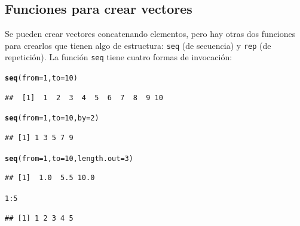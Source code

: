 \documentclass{config/apuntes}\usepackage[]{graphicx}\usepackage[]{xcolor}
\makeatletter
\newcommand{\hlnum}[1]{\textcolor[rgb]{0.686,0.059,0.569}{#1}}%
\newcommand{\hlopt}[1]{\textcolor[rgb]{0,0,0}{#1}}%
\newcommand{\hldef}[1]{\textcolor[rgb]{0.345,0.345,0.345}{#1}}%
\newcommand{\hlkwc}[1]{\textcolor[rgb]{0.333,0.667,0.333}{#1}}%
\newcommand{\hlkwd}[1]{\textcolor[rgb]{0.737,0.353,0.396}{\textbf{#1}}}%
\newenvironment{kframe}{%
 \def\at@end@of@kframe{}%
 \ifinner\ifhmode%
  \def\at@end@of@kframe{\end{minipage}}%
  \begin{minipage}{\columnwidth}%
 \fi\fi%
 \def\FrameCommand##1{\hskip\@totalleftmargin \hskip-\fboxsep
 \colorbox{shadecolor}{##1}\hskip-\fboxsep
     \hskip-\linewidth \hskip-\@totalleftmargin \hskip\columnwidth}%
 \MakeFramed {\advance\hsize-\width
   \@totalleftmargin\z@ \linewidth\hsize
   \@setminipage}}%
 {\par\unskip\endMakeFramed%
 \at@end@of@kframe}
\newenvironment{knitrout}{}{} %
\newcommand{\code}[1]{\texttt{#1}}
\makeatother
\begin{document}
\subsection{Funciones para crear vectores}
Se pueden crear vectores concatenando elementos, pero hay otras dos funciones para crearlos que tienen algo de estructura: \code{seq} (de secuencia) y \code{rep} (de repetición). La función \code{seq} tiene cuatro formas de invocación:
\begin{knitrout}
\color{fgcolor}\begin{kframe}
\begin{alltt}
\hlkwd{seq}\hldef{(}\hlkwc{from} \hldef{=} \hlnum{1}\hldef{,} \hlkwc{to} \hldef{=} \hlnum{10}\hldef{)}
\end{alltt}
\begin{verbatim}
##  [1]  1  2  3  4  5  6  7  8  9 10
\end{verbatim}
\begin{alltt}
\hlkwd{seq}\hldef{(}\hlkwc{from} \hldef{=} \hlnum{1}\hldef{,} \hlkwc{to} \hldef{=} \hlnum{10}\hldef{,} \hlkwc{by} \hldef{=} \hlnum{2}\hldef{)}
\end{alltt}
\begin{verbatim}
## [1] 1 3 5 7 9
\end{verbatim}
\begin{alltt}
\hlkwd{seq}\hldef{(}\hlkwc{from} \hldef{=} \hlnum{1}\hldef{,} \hlkwc{to} \hldef{=} \hlnum{10}\hldef{,} \hlkwc{length.out} \hldef{=} \hlnum{3}\hldef{)}
\end{alltt}
\begin{verbatim}
## [1]  1.0  5.5 10.0
\end{verbatim}
\begin{alltt}
\hlnum{1}\hlopt{:}\hlnum{5}
\end{alltt}
\begin{verbatim}
## [1] 1 2 3 4 5
\end{verbatim}
\end{kframe}
\end{knitrout}
\end{document}
